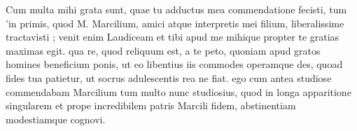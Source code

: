 


Cum multa mihi grata sunt, quae tu adductus mea commendatione fecisti, tum 'in primis, quod M. Marcilium, amici atque interpretis mei filium, liberalissime tractavisti ; venit enim Laudiceam et tibi apud me mihique propter te gratias maximas egit. qua re, quod reliquum est, a te peto, quoniam apud gratos homines beneficium ponis, ut eo libentius iis commodes operamque des, quoad fides tua patietur, ut socrus adulescentis rea ne fiat. ego cum antea studiose
commendabam Marcilium tum multo nunc studiosius, quod in longa apparitione singularem et prope incredibilem patris Marcili fidem, abstinentiam modestiamque cognovi.
